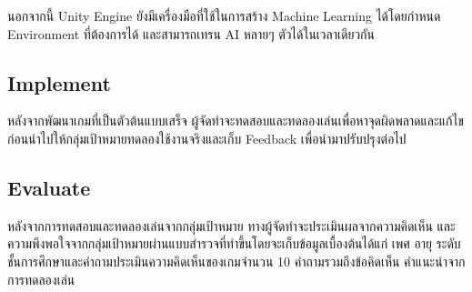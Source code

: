 \documentclass[12pt,oneside,openright,a4paper]{cpe-thai-project}
\begin{document}
นอกจากนี้ Unity Engine ยังมีเครื่องมือที่ใช้ในการสร้าง Machine Learning ได้โดยกำหนด Environment ที่ต้องการได้ 
และสามารถเทรน AI หลายๆ ตัวได้ในเวลาเดียวกัน


\subsection{Implement}
หลังจากพัฒนาเกมที่เป็นตัวต้นแบบเสร็จ ผู้จัดทำจะทดสอบและทดลองเล่นเพื่อหาจุดผิดพลาดและแก้ไข 
ก่อนนำไปให้กลุ่มเป้าหมายทดลองใช้งานจริงและเก็บ Feedback เพื่อนำมาปรับปรุงต่อไป

\subsection{Evaluate}

หลังจากการทดสอบและทดลองเล่นจากกลุ่มเป้าหมาย ทางผู้จัดทำจะประเมินผลจากความคิดเห็น
และความพึงพอใจจากกลุ่มเป้าหมายผ่านแบบสำรวจที่ทำขึ้นโดยจะเก็บข้อมูลเบื้องต้นได้แก่ เพศ อายุ 
ระดับชั้นการศึกษาและคำถามประเมินความคิดเห็นของเกมจำนวน 10 คำถามรวมถึงข้อคิดเห็น คำแนะนำจากการทดลองเล่น





\end{document}
